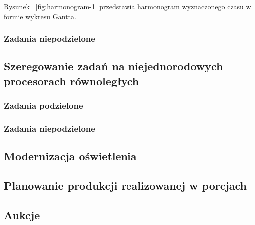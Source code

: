 \documentclass[
    12pt, %
]{../fphw}
\begin{document}
Rysunek ~\ref{fig:harmonogram-1} przedstawia harmonogram wyznaczonego czasu
w formie wykresu Gantta.

\subsubsection{Zadania niepodzielone}

\subsection{Szeregowanie zadań na niejednorodowych procesorach równoległych}
\subsubsection{Zadania podzielone}
\subsubsection{Zadania niepodzielone}

\subsection{Modernizacja oświetlenia}
\subsection{Planowanie produkcji realizowanej w porcjach}
\subsection{Aukcje}
\end{document}
